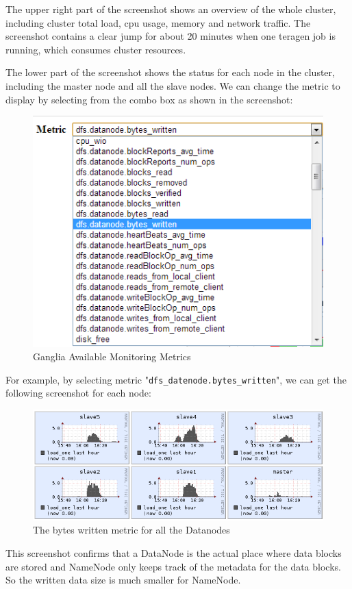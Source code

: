 The upper right part of the screenshot shows an overview of the whole cluster, including cluster total load, cpu usage, memory and network traffic. The screenshot contains a clear jump for about 20 minutes when one teragen job is running, which consumes cluster resources.

The lower part of the screenshot shows the status for each node in the cluster, including the master node and all the slave nodes. We can change the metric to display by selecting from the combo box as shown in the screenshot:
\begin{figure}[ht]
  \centering
  \includegraphics[width=.9\textwidth]{figs/5163os_06_09.png}
  \caption{Ganglia Available Monitoring Metrics}\label{fig:ganglia.metrics}
\end{figure} 
For example, by selecting metric "\verb|dfs_datenode.bytes_written|", we can get the following screenshot for each node:
\begin{figure}[ht]
  \centering
  \includegraphics[width=.9\textwidth]{figs/5163os_06_10.png}
  \caption{The bytes written metric for all the Datanodes}\label{fig:bytes.written.metric}
\end{figure} 
This screenshot confirms that a DataNode is the actual place where data blocks are stored and NameNode only keeps track of the metadata for the data blocks. So the written data size is much smaller for NameNode.

